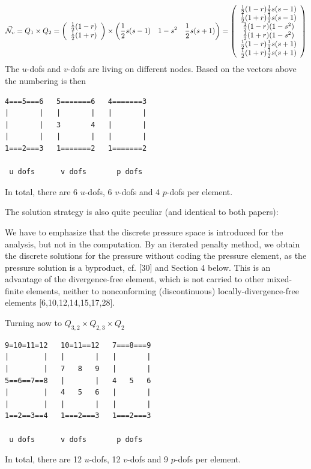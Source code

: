 \[
\vec{{\mathcal{N}}}_v = Q_1 \times Q_2 = 
\left(
\begin{array}{c}
\frac12 (1-r) \\
\frac12(1+r)
\end{array}
\right)
\times
\left(
\frac12 s(s-1)  \quad
1-s^2 \quad
\frac12 s(s+1)
\right)
=
\left(
\begin{array}{c}
\frac12 (1-r) \frac12 s(s-1) \\
\frac12(1+r)  \frac12 s(s-1) \\
\frac12 (1-r) (1-s^2) \\
\frac12(1+r)  (1-s^2) \\
\frac12 (1-r) \frac12 s(s+1)\\
\frac12(1+r)  \frac12 s(s+1)
\end{array}
\right)
\]
The $u$-dofs and $v$-dofs are living on different nodes.
Based on the vectors above the numbering is then 
\begin{verbatim}
4===5===6   5=======6   4=======3
|       |   |       |   |       |
|       |   3       4   |       |
|       |   |       |   |       |
1===2===3   1=======2   1=======2

 u dofs      v dofs       p dofs

\end{verbatim}
In total, there are 6 $u$-dofs, 6 $v$-dofs and 4 $p$-dofs per element.


The solution strategy is also quite peculiar (and identical to both papers):
\begin{displayquote}
{\color{darkgray}
We have to emphasize
that the discrete pressure space is introduced for the analysis, but not in the
computation. By an iterated penalty method, we obtain the discrete solutions
for the pressure without coding the pressure element, as the pressure
solution is a byproduct, cf. [30] and Section 4 below. This is an advantage
of the divergence-free element, which is not carried to other mixed-ﬁnite
elements, neither to nonconforming (discontinuous) locally-divergence-free
elements [6,10,12,14,15,17,28].
}
\end{displayquote}

Turning now to $Q_{3,2}\times Q_{2,3}\times Q_{2}$
\begin{verbatim}
9=10=11=12   10=11==12   7===8===9
|        |   |       |   |       |
|        |   7   8   9   |       |
5==6==7==8   |       |   4   5   6
|        |   4   5   6   |       |
|        |   |       |   |       |
1==2==3==4   1===2===3   1===2===3

 u dofs      v dofs       p dofs

\end{verbatim}
In total, there are 12 $u$-dofs, 12 $v$-dofs and 9 $p$-dofs per element.

